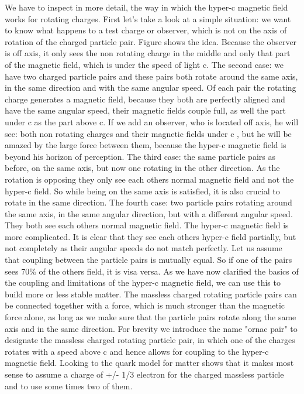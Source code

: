 We have to inspect in more detail, the way in which the hyper-c magnetic field works for rotating charges. First let's take a look at a simple situation: we want to know what happens to a test charge or observer, which is not on the axis of rotation of the charged particle pair. Figure shows the idea. Because the observer is off axis, it only sees the non rotating charge in the middle and only that part of the magnetic field, which is under the speed of light c. The second case: we have two charged particle pairs and these pairs both rotate around the same axis, in the same direction and with the same angular speed. Of each pair the rotating charge generates a magnetic field, because they both are perfectly aligned and have the same angular speed, their magnetic fields couple full, as well the part under c as the part above c. If we add an observer, who is located off axis, he will see: both non rotating charges and their magnetic fields under c , but he will be amazed by the large force between them, because the hyper-c magnetic field is beyond his horizon of perception. The third case: the same particle pairs as before, on the same axis, but now one rotating in the other direction. As the rotation is opposing they only see each others normal magnetic field and not the hyper-c field. So while being on the same axis is satisfied, it is also crucial to rotate in the same direction. The fourth case: two particle pairs rotating around the same axis, in the same angular direction, but with a different angular speed.  They both see each others normal magnetic field. The hyper-c magnetic field is more complicated. It is clear that they see each others hyper-c field partially, but not completely as their angular speeds do not match perfectly. Let us assume that coupling between the particle pairs is mutually equal. So if one of the pairs sees 70\% of the others field, it is visa versa.
As we have now clarified the basics of the coupling and limitations of the hyper-c magnetic field, we can use this to build more or less stable matter. The massless charged rotating particle pairs can be connected together with a force, which is much stronger than the magnetic force alone, as long as we make sure that the particle pairs rotate along the same axis and in the same direction. For brevity we introduce the name "ornac pair" to designate the massless charged rotating particle pair, in which one of the charges rotates with a speed above c and hence allows for coupling to the hyper-c magnetic field. Looking to the quark model for matter shows that it makes most sense to assume a charge of +/- 1/3 electron for the charged massless particle and to use some times two of them.

